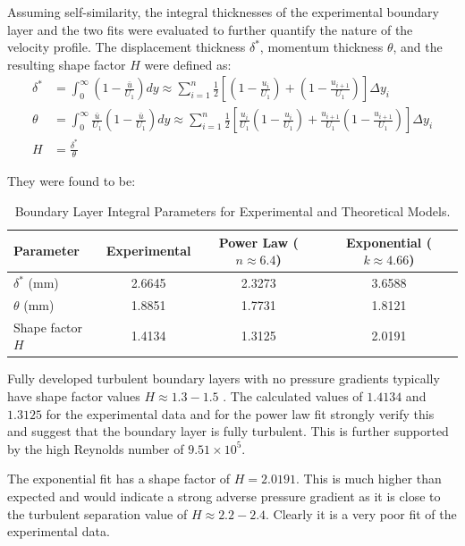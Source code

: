 \documentclass{article}
\begin{document}
Assuming self-similarity, the integral thicknesses of the experimental boundary layer and the two fits were evaluated to further quantify the nature of the velocity profile. The displacement thickness $\delta^*$, momentum thickness $\theta$, and the resulting shape factor $H$ were defined as:
\begin{align}
    \delta^* &= \int_{0}^{\infty} \left( 1 - \frac{\bar{u}}{U_{1}} \right) dy \approx \sum_{i=1}^{n} \frac{1}{2} \left[ \left( 1 - \frac{u_{i}}{U_{1}} \right) + \left( 1 - \frac{u_{i+1}}{U_{1}} \right) \right] \Delta y_{i} \label{eq:displacement thickness}\\
    \theta &= \int_{0}^{\infty} \frac{\bar{u}}{U_{1}} \left( 1 - \frac{\bar{u}}{U_{1}} \right) dy
    \approx \sum_{i=1}^{n} \frac{1}{2} \left[ \frac{u_i}{U_{1}} \left( 1 - \frac{u_i}{U_{1}} \right) + \frac{u_{i+1}}{U_{1}} \left( 1 - \frac{u_{i+1}}{U_{1}} \right) \right] \Delta y_i \label{eq:momentum thickness} \\
    H &= \frac{\delta^*}{\theta}
    \label{eq:shape_factor}
\end{align}

They were found to be:

\begin{table}[htbp]
\centering
\begin{tabular}{lccc}
\toprule
\textbf{Parameter} & \textbf{Experimental} & \textbf{Power Law} ($n \approx 6.4$) & \textbf{Exponential} ($k \approx 4.66$) \\
\midrule
$\delta^*$ (mm) & 2.6645 & 2.3273 & 3.6588 \\
$\theta$ (mm)       & 1.8851 & 1.7731 & 1.8121 \\
Shape factor $H$                       & 1.4134 & 1.3125 & 2.0191 \\
\bottomrule
\end{tabular}
\caption{Boundary Layer Integral Parameters for Experimental and Theoretical Models.}
\label{tab:shape_factor_etc}
\end{table}

Fully developed turbulent boundary layers with no pressure gradients typically have shape factor values $H\approx 1.3-1.5$ \cite{schlichting1961boundary}. The calculated values of $1.4134$ and $1.3125$ for the experimental data and for the power law fit strongly verify this and suggest that the boundary layer is fully turbulent. This is further supported by the high Reynolds number of $9.51 \times 10^5$.

The exponential fit has a shape factor of $H=2.0191$. This is much higher than expected and would indicate a strong adverse pressure gradient as it is close to the turbulent separation value of $H \approx 2.2-2.4$. Clearly it is a very poor fit of the experimental data.
\end{document}
